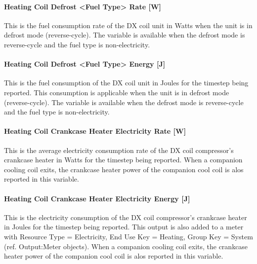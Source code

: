 \paragraph{Heating Coil Defrost \textless{}Fuel Type\textgreater{} Rate {[}W{]}}\label{heating-coil-defrost-fuel-type-rate-w}

This is the fuel consumption rate of the DX coil unit in Watts when the unit is in defrost mode (reverse-cycle). The variable is available when the defrost mode is reverse-cycle and the fuel type is non-electricity.

\paragraph{Heating Coil Defrost \textless{}Fuel Type\textgreater{} Energy {[}J{]}}\label{heating-coil-defrost-fuel-type-energy-j}

This is the fuel consumption of the DX coil unit in Joules for the timestep being reported. This consumption is applicable when the unit is in defrost mode (reverse-cycle). The variable is available when the defrost mode is reverse-cycle and the fuel type is non-electricity.

\paragraph{Heating Coil Crankcase Heater Electricity Rate {[}W{]}}\label{heating-coil-crankcase-heater-electric-power-w-1}

This is the average electricity consumption rate of the DX coil compressor's crankcase heater in Watts for the timestep being reported. When a companion cooling coil exits, the crankcase heater power of the companion cool coil is alos reported in this variable.

\paragraph{Heating Coil Crankcase Heater Electricity Energy {[}J{]}}\label{heating-coil-crankcase-heater-electric-energy-j-1}

This is the electricity consumption of the DX coil compressor's crankcase heater in Joules for the timestep being reported. This output is also added to a meter with Resource Type = Electricity, End Use Key = Heating, Group Key = System (ref. Output:Meter objects). When a companion cooling coil exits, the crankcase heater power of the companion cool coil is alos reported in this variable.

